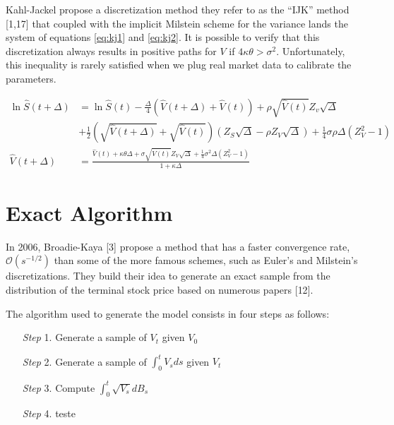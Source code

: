 \documentclass[12pt,twoside]{reedthesis}
\theoremstyle{definition}
\theoremstyle{definition}
\theoremstyle{remark}
\begin{document}
  Kahl-Jackel propose a discretization method they refer to as the ``IJK''
  method {[}1,17{]} that coupled with the implicit Milstein scheme for the
  variance lands the system of equations \eqref{eq:kj1} and \eqref{eq:kj2}. It
  is possible to verify that this discretization always results in
  positive paths for \(V\) if \(4 \kappa \theta > \sigma^2\).
  Unfortunately, this inequality is rarely satisfied when we plug real
  market data to calibrate the parameters.
  \begin{small}
  \begin{align}
  \label{eq:kj1}
  \ln \hat{S}(t + \Delta) &= \ln \hat{S}(t) - \frac{\Delta}{4}\left( \hat{V}(t+\Delta) + \hat{V}(t) \right) + \rho \sqrt{\hat{V}(t)}Z_v\sqrt{\Delta} \\ \nonumber
  &+ \frac{1}{2} \left( \sqrt{\hat{V}(t+\Delta)} + \sqrt{\hat{V}(t)} \right) \left( Z_S \sqrt{\Delta} - \rho Z_V \sqrt{\Delta}\right) + \frac{1}{4} \sigma \rho \Delta \left( Z_{V}^{2} - 1 \right) \\
  \label{eq:kj2}
  \hat{V}(t+\Delta) &= \frac{\hat{V}(t) + \kappa \theta \Delta + \sigma \sqrt{\hat{V}(t)}Z_V \sqrt{\Delta}+ \frac{1}{4}\sigma^2 \Delta \left(Z_V^2-1 \right)}{1+ \kappa \Delta}
  \end{align}
  \end{small}
  \section{Exact Algorithm}\label{exact-algorithm}
  
  In 2006, Broadie-Kaya {[}3{]} propose a method that has a faster
  convergence rate, \(\mathcal{O} \left( s^{-1/2} \right)\) than some of
  the more famous schemes, such as Euler's and Milstein's discretizations.
  They build their idea to generate an exact sample from the distribution
  of the terminal stock price based on numerous papers {[}12{]}.
  
  The algorithm used to generate the model consists in four steps as
  follows:
  \begin{itemize}
  \item [\textit{Step} 1.] Generate a sample of $V_t$ given $V_0$
  \item [\textit{Step} 2.] Generate a sample of $\int_0^t V_sds$ given $V_t$
  \item [\textit{Step} 3.] Compute $\int_0^t \sqrt{V_s}dB_s$
  \item [\textit{Step} 4.] teste
  \end{itemize}
  \clearpage
  
\end{document}
